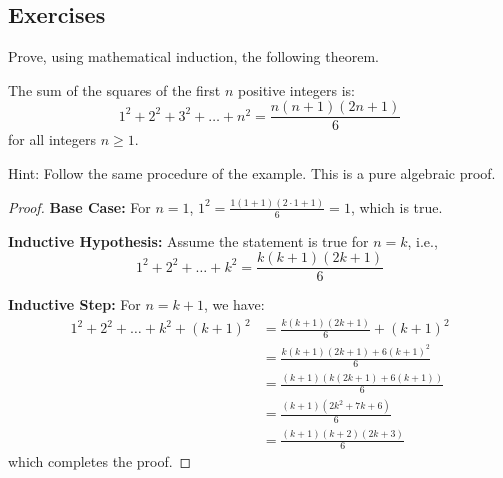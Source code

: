 \documentclass[
	12pt, %
	fleqn, %
	a4paper, %
]{LegrandOrangeBook}
\begin{document}
\subsection{Exercises}
\begin{exercise}
Prove, using mathematical induction, the following theorem.
\begin{theorem}
    The sum of the squares of the first \( n \) positive integers is:
\[
1^2 + 2^2 + 3^2 + \ldots + n^2 = \frac{n(n + 1)(2n + 1)}{6}
\]
for all integers \( n \geq 1 \).
\end{theorem}
Hint: Follow the same procedure of the example. This is a pure algebraic proof.
\end{exercise}

\begin{proof}
\textbf{Base Case:} For \( n = 1 \), \( 1^2 = \frac{1(1 + 1)(2 \cdot 1 + 1)}{6} = 1 \), which is true.

\textbf{Inductive Hypothesis:} Assume the statement is true for \( n = k \), i.e., 
\[
1^2 + 2^2 + \ldots + k^2 = \frac{k(k + 1)(2k + 1)}{6}
\]

\textbf{Inductive Step:} For \( n = k + 1 \), we have:
\begin{align*}
1^2 + 2^2 + \ldots + k^2 + (k + 1)^2 &= \frac{k(k + 1)(2k + 1)}{6} + (k + 1)^2 \\
&= \frac{k(k + 1)(2k + 1) + 6(k + 1)^2}{6} \\
&= \frac{(k + 1)(k(2k + 1) + 6(k + 1))}{6} \\
&= \frac{(k + 1)(2k^2 + 7k + 6)}{6} \\
&= \frac{(k + 1)(k + 2)(2k + 3)}{6}
\end{align*}
which completes the proof.
\end{proof}
\end{document}
